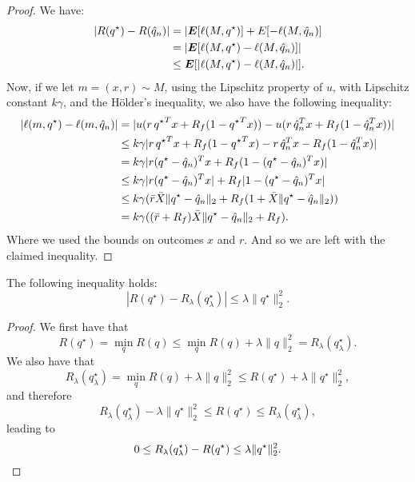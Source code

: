 \begin{proof}
We have:
\begin{align*}
  |R({q^\star}) - R({\hat q}_n)| &= |\bm E[\ell(M,{q^\star})] + E[-\ell(M,{\hat q}_n)]\\
                                           & = |\bm E[\ell(M,{q^\star}) - \ell(M,{\hat q}_n)]|\\
                                           & \leq \bm E[|\ell(M,{q^\star}) - \ell(M,{\hat q}_n)|].
\end{align*}
Now, if we let $m=(x,r)\sim M$, using the Lipschitz property of $u$, with Lipschitz
constant $k\gamma$, and the Hölder's inequality, we also have the following inequality:
\begin{align*}
  |\ell(m,{q^\star}) - \ell(m,{\hat q}_n)| 
  &= |u(r\,{q^\star}^Tx + R_f(1-{q^\star}^{T}x)) - u(r\,{\hat q}_n^Tx + R_f(1-{\hat q}_n^{T}x))| \\
  & \leq k\gamma|r\,{q^\star}^Tx + R_f(1-{q^\star}^Tx) - r\,{\hat q}_n^Tx - R_f(1-{\hat q}_n^Tx)|\\
  & = k\gamma|r({q^\star}-{\hat q}_n)^Tx + R_f(1-({q^\star}-{\hat q}_n)^Tx)|\\
  & \leq k\gamma|r({q^\star}-{\hat q}_n)^Tx| + R_f|1-({q^\star}-{\hat q}_n)^Tx|\\
  & \leq k\gamma(\bar r\bar X \|{q^\star}-{\hat q}_n\|_2 + R_f(1+\bar X \|{q^\star}-{\hat q}_n\|_2))\\
  & = k\gamma((\bar r + R_f)\bar X \|{q^\star} - {\hat q}_n\|_2 + R_f).
\end{align*}
Where we used the bounds on outcomes $x$ and $r$. And so we are left with the claimed
inequality. 
\end{proof}

\begin{claim}
  \label{delage_bound_claim}
  The following inequality holds:
  \[
    |R(q^\star) - R_\lambda(q^\star_\lambda)| \leq \lambda\|q^\star\|^2_2.
  \]
\end{claim}
\begin{proof}
  We first have that
  \[
    R(q^\star) = \min_q R(q) \leq \min_q R(q) + \lambda\|q\|_2^2 = R_\lambda(q^\star_\lambda).
  \]
  We also have that
  \[
    R_\lambda(q^\star_\lambda) = \min_q R(q) + \lambda\|q\|^2_2 \leq R(q^\star) + \lambda\|q^\star\|^2_2,
  \]
  and therefore
  \[
    R_\lambda(q^\star_\lambda) - \lambda\|q^\star\|^2_2 \leq R(q^\star) \leq R_\lambda(q^\star_\lambda),
  \]
  leading to
  \[
    0 \leq R_\lambda(q^\star_\lambda) - R(q^\star) \leq \lambda\|q^\star\|^2_2.\qedhere
  \]
\end{proof}

